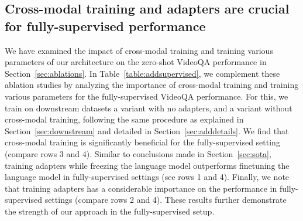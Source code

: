 \subsection{Cross-modal training and adapters are crucial for fully-supervised performance}\label{sec:addablation}
We have examined the impact of cross-modal training and training various parameters of our architecture on the zero-shot VideoQA performance in Section~\ref{sec:ablations}.
In Table~\ref{table:addsupervised}, we complement these ablation studies by analyzing the importance of cross-modal training and training various parameters for the fully-supervised VideoQA performance.
For this, we train on downstream datasets a variant with no adapters, and a variant without cross-modal training, following the same procedure as explained in Section~\ref{sec:downstream} and detailed in Section~\ref{sec:adddetails}.
We find that cross-modal training is significantly beneficial for the fully-supervised setting (compare rows 3 and 4).
Similar to conclusions made in Section~\ref{sec:sota}, training adapters while freezing the language model outperforms finetuning the language model in fully-supervised settings (see rows 1 and 4).
Finally, we note that training adapters has a considerable importance on the performance in fully-supervised settings (compare rows 2 and 4).
These results further demonstrate the strength of our approach in the fully-supervised setup.


